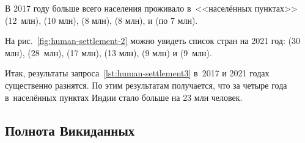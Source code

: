 
В 2017 году больше всего населения проживало в~<<населённых пунктах>> 
 (12~млн), 
 (\num{10} млн), 
 (\num{8} млн), 
 (\num{8} млн), 
 и 
 (по \num{7} млн). 

На рис.~\ref{fig:human-settlement-2} можно увидеть список стран на 2021 год: 
 (\num{30} млн), 
 (28~млн), 
 (\num{17} млн), 
 (\num{13} млн), 
 (\num{9} млн) и 
 (\num{9}~млн). 

Итак, результаты запроса~\ref{lst:human-settlement3} в~2017 и 2021 годах существенно разнятся. 
По этим результатам получается, что за четыре года 
в~населённых пунктах Индии стало больше на 23 млн человек. 


\subsection{Полнота Викиданных}

